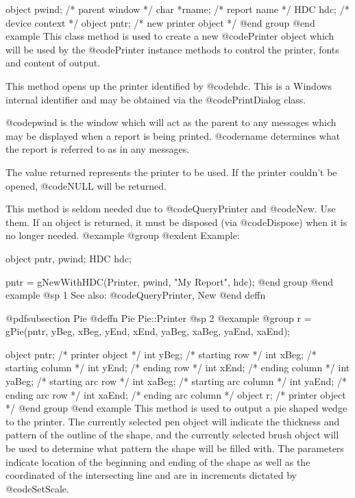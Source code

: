 object  pwind;  /*  parent window       */
char    *rname; /*  report name         */
HDC     hdc;    /*  device context      */
object  pntr;   /*  new printer object  */
@end group
@end example
This class method is used to create a new @code{Printer} object which
will be used by the @code{Printer} instance methods to control the
printer, fonts and content of output.

This method opens up the printer identified by @code{hdc}.  This is
a Windows internal identifier and may be obtained via the
@code{PrintDialog} class.

@code{pwind} is the window which will act as the parent to any
messages which may be displayed when a report is being printed.
@code{rname} determines what the report is referred to as in any
messages.

The value returned represents the printer to be used.  If the 
printer couldn't be opened, @code{NULL} will be returned.

This method is seldom needed due to @code{QueryPrinter} and @code{New}.
Use them. If an object is returned, it must be disposed (via
@code{Dispose}) when it is no longer needed.
@example
@group
@exdent Example:

object  pntr, pwind;
HDC     hdc;

pntr = gNewWithHDC(Printer, pwind, "My Report", hdc);
@end group
@end example
@sp 1
See also:  @code{QueryPrinter, New}
@end deffn



















@pdfsubsection {Pie}
@deffn {Pie} Pie::Printer
@sp 2
@example
@group
r = gPie(pntr, yBeg, xBeg, yEnd, xEnd, yaBeg, xaBeg, yaEnd, xaEnd);

object  pntr;   /*  printer object         */
int     yBeg;   /*  starting row           */
int     xBeg;   /*  starting column        */
int     yEnd;   /*  ending row             */
int     xEnd;   /*  ending column          */
int     yaBeg;  /*  starting arc row       */
int     xaBeg;  /*  starting arc column    */
int     yaEnd;  /*  ending arc row         */
int     xaEnd;  /*  ending arc column      */
object  r;      /*  printer object         */
@end group
@end example
This method is used to output a pie shaped wedge to the printer.  The
currently selected pen object will indicate the thickness and pattern of
the outline of the shape, and the currently selected brush object will
be used to determine what pattern the shape will be filled with.  The
parameters indicate location of the beginning and ending of the shape as
well as the coordinated of the intersecting line and are in increments
dictated by @code{SetScale}.

